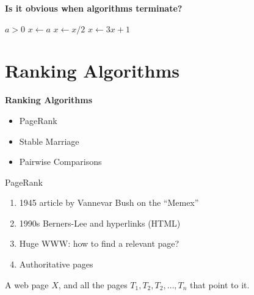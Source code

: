 \begin{frame}
{\bf Is it obvious when algorithms terminate?}

\begin{algorithmic}
\REQUIRE $a>0$
\STATE $x\longleftarrow a$
		\STATE $x\longleftarrow x/2$
	\ELSE
		\STATE $x\longleftarrow 3x+1$
	\ENDIF
\ENDWHILE
\end{algorithmic}


\end{frame}

\section{Ranking Algorithms}

\begin{frame}
{\bf Ranking Algorithms}

\begin{itemize}
\item PageRank
\item Stable Marriage
\item Pairwise Comparisons
\end{itemize}
\end{frame}

\begin{frame}
{PageRank}

\begin{enumerate}
\item 1945 article by Vannevar Bush on the ``Memex''
\item 1990s Berners-Lee and hyperlinks (HTML)
\item Huge WWW: how to find a relevant page?
\item Authoritative pages
\end{enumerate}
\end{frame}

\begin{frame}
A web page $X$, and all the pages $T_1,T_2,T_2,\ldots,T_n$ that point
to it.
\begin{center}
\begin{minipage}{6cm}
\end{minipage}
\end{center}
\end{frame}

